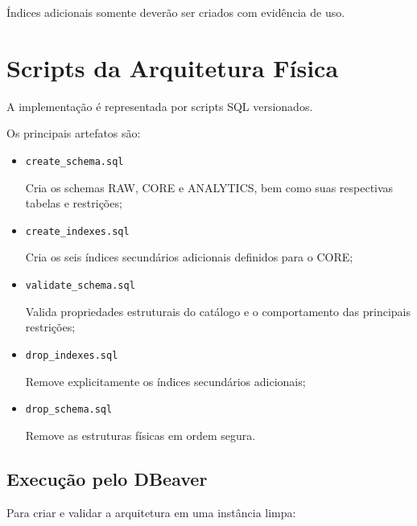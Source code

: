 \documentclass[12pt,a4paper]{article}
\begin{document}
{	Índices adicionais somente deverão ser criados com evidência de uso.
	
	\section{Scripts da Arquitetura Física}
	
	A implementação é representada por scripts SQL versionados.
	
	Os principais artefatos são:
	
	\begin{itemize}[leftmargin=1.2cm]
		
		\item \texttt{create\_schema.sql}
		
		Cria os schemas RAW, CORE e ANALYTICS, bem como suas respectivas
		tabelas e restrições;
		
		\item \texttt{create\_indexes.sql}
		
		Cria os seis índices secundários adicionais definidos para o CORE;
		
		\item \texttt{validate\_schema.sql}
		
		Valida propriedades estruturais do catálogo e o comportamento das
		principais restrições;
		
		\item \texttt{drop\_indexes.sql}
		
		Remove explicitamente os índices secundários adicionais;
		
		\item \texttt{drop\_schema.sql}
		
		Remove as estruturas físicas em ordem segura.
		
	\end{itemize}
	
	\subsection{Execução pelo DBeaver}
	
	Para criar e validar a arquitetura em uma instância limpa:
	
	\begin{enumerate}[leftmargin=1.2cm]
		

\end{enumerate}}
\end{document}
